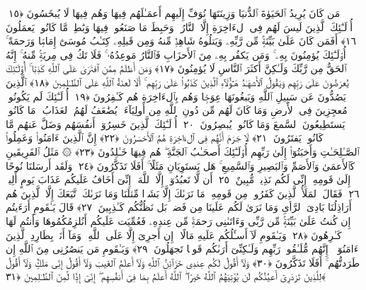  مَن كَانَ يُرِيدُ ٱلحَيَوٰةَ ٱلدُّنيَا وَزِينَتَهَا نُوَفِّ إِلَيهِم أَعمَـٰلَهُم فِيهَا وَهُم فِيهَا لَا يُبخَسُونَ ﴿١٥﴾
 أُو۟لَـٰٓئِكَ ٱلَّذِينَ لَيسَ لَهُم فِى ٱلءَاخِرَةِ إِلَّا ٱلنَّارُ ۖ وَحَبِطَ مَا صَنَعُوا۟ فِيهَا وَبَٰطِلٌۭ مَّا كَانُوا۟ يَعمَلُونَ ﴿١٦﴾
 أَفَمَن كَانَ عَلَىٰ بَيِّنَةٍۢ مِّن رَّبِّهِۦ وَيَتلُوهُ شَاهِدٌۭ مِّنهُ وَمِن قَبلِهِۦ كِتَـٰبُ مُوسَىٰٓ إِمَامًۭا وَرَحمَةً ۚ أُو۟لَـٰٓئِكَ يُؤمِنُونَ بِهِۦ ۚ وَمَن يَكفُر بِهِۦ مِنَ ٱلأَحزَابِ فَٱلنَّارُ مَوعِدُهُۥ ۚ فَلَا تَكُ فِى مِريَةٍۢ مِّنهُ ۚ إِنَّهُ ٱلحَقُّ مِن رَّبِّكَ وَلَـٰكِنَّ أَكثَرَ ٱلنَّاسِ لَا يُؤمِنُونَ ﴿١٧﴾
 وَمَن أَظلَمُ مِمَّنِ ٱفتَرَىٰ عَلَى ٱللَّهِ كَذِبًا ۚ أُو۟لَـٰٓئِكَ يُعرَضُونَ عَلَىٰ رَبِّهِم وَيَقُولُ ٱلأَشهَـٰدُ هَـٰٓؤُلَآءِ ٱلَّذِينَ كَذَبُوا۟ عَلَىٰ رَبِّهِم ۚ أَلَا لَعنَةُ ٱللَّهِ عَلَى ٱلظَّـٰلِمِينَ ﴿١٨﴾
 ٱلَّذِينَ يَصُدُّونَ عَن سَبِيلِ ٱللَّهِ وَيَبغُونَهَا عِوَجًۭا وَهُم بِٱلءَاخِرَةِ هُم كَـٰفِرُونَ ﴿١٩﴾
 أُو۟لَـٰٓئِكَ لَم يَكُونُوا۟ مُعجِزِينَ فِى ٱلأَرضِ وَمَا كَانَ لَهُم مِّن دُونِ ٱللَّهِ مِن أَولِيَآءَ ۘ يُضَٰعَفُ لَهُمُ ٱلعَذَابُ ۚ مَا كَانُوا۟ يَستَطِيعُونَ ٱلسَّمعَ وَمَا كَانُوا۟ يُبصِرُونَ ﴿٢٠﴾
 أُو۟لَـٰٓئِكَ ٱلَّذِينَ خَسِرُوٓا۟ أَنفُسَهُم وَضَلَّ عَنهُم مَّا كَانُوا۟ يَفتَرُونَ ﴿٢١﴾
 لَا جَرَمَ أَنَّهُم فِى ٱلءَاخِرَةِ هُمُ ٱلأَخسَرُونَ ﴿٢٢﴾
 إِنَّ ٱلَّذِينَ ءَامَنُوا۟ وَعَمِلُوا۟ ٱلصَّـٰلِحَـٰتِ وَأَخبَتُوٓا۟ إِلَىٰ رَبِّهِم أُو۟لَـٰٓئِكَ أَصحَـٰبُ ٱلجَنَّةِ ۖ هُم فِيهَا خَـٰلِدُونَ ﴿٢٣﴾
 ۞ مَثَلُ ٱلفَرِيقَينِ كَٱلأَعمَىٰ وَٱلأَصَمِّ وَٱلبَصِيرِ وَٱلسَّمِيعِ ۚ هَل يَستَوِيَانِ مَثَلًا ۚ أَفَلَا تَذَكَّرُونَ ﴿٢٤﴾
 وَلَقَد أَرسَلنَا نُوحًا إِلَىٰ قَومِهِۦٓ إِنِّى لَكُم نَذِيرٌۭ مُّبِينٌ ﴿٢٥﴾
 أَن لَّا تَعبُدُوٓا۟ إِلَّا ٱللَّهَ ۖ إِنِّىٓ أَخَافُ عَلَيكُم عَذَابَ يَومٍ أَلِيمٍۢ ﴿٢٦﴾
 فَقَالَ ٱلمَلَأُ ٱلَّذِينَ كَفَرُوا۟ مِن قَومِهِۦ مَا نَرَىٰكَ إِلَّا بَشَرًۭا مِّثلَنَا وَمَا نَرَىٰكَ ٱتَّبَعَكَ إِلَّا ٱلَّذِينَ هُم أَرَاذِلُنَا بَادِىَ ٱلرَّأىِ وَمَا نَرَىٰ لَكُم عَلَينَا مِن فَضلٍۭ بَل نَظُنُّكُم كَـٰذِبِينَ ﴿٢٧﴾
 قَالَ يَـٰقَومِ أَرَءَيتُم إِن كُنتُ عَلَىٰ بَيِّنَةٍۢ مِّن رَّبِّى وَءَاتَىٰنِى رَحمَةًۭ مِّن عِندِهِۦ فَعُمِّيَت عَلَيكُم أَنُلزِمُكُمُوهَا وَأَنتُم لَهَا كَـٰرِهُونَ ﴿٢٨﴾
 وَيَـٰقَومِ لَآ أَسـَٔلُكُم عَلَيهِ مَالًا ۖ إِن أَجرِىَ إِلَّا عَلَى ٱللَّهِ ۚ وَمَآ أَنَا۠ بِطَارِدِ ٱلَّذِينَ ءَامَنُوٓا۟ ۚ إِنَّهُم مُّلَـٰقُوا۟ رَبِّهِم وَلَـٰكِنِّىٓ أَرَىٰكُم قَومًۭا تَجهَلُونَ ﴿٢٩﴾
 وَيَـٰقَومِ مَن يَنصُرُنِى مِنَ ٱللَّهِ إِن طَرَدتُّهُم ۚ أَفَلَا تَذَكَّرُونَ ﴿٣٠﴾
 وَلَآ أَقُولُ لَكُم عِندِى خَزَآئِنُ ٱللَّهِ وَلَآ أَعلَمُ ٱلغَيبَ وَلَآ أَقُولُ إِنِّى مَلَكٌۭ وَلَآ أَقُولُ لِلَّذِينَ تَزدَرِىٓ أَعيُنُكُم لَن يُؤتِيَهُمُ ٱللَّهُ خَيرًا ۖ ٱللَّهُ أَعلَمُ بِمَا فِىٓ أَنفُسِهِم ۖ إِنِّىٓ إِذًۭا لَّمِنَ ٱلظَّـٰلِمِينَ ﴿٣١﴾
